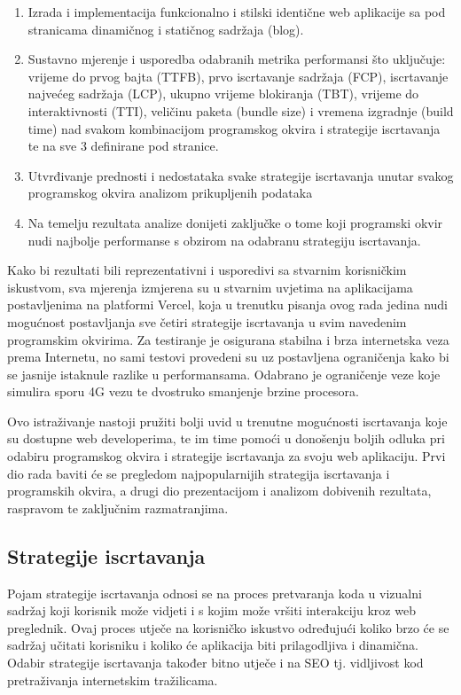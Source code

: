 \begin{enumerate}
    \item Izrada i implementacija funkcionalno i stilski identične web aplikacije sa pod stranicama dinamičnog i statičnog sadržaja (blog).
    \item Sustavno mjerenje i usporedba odabranih metrika performansi što uključuje: vrijeme do prvog bajta (TTFB), prvo iscrtavanje sadržaja (FCP), iscrtavanje najvećeg sadržaja (LCP), ukupno vrijeme blokiranja (TBT), vrijeme do interaktivnosti (TTI), veličinu paketa (bundle size) i vremena izgradnje (build time) nad svakom kombinacijom programskog okvira i strategije iscrtavanja te na sve 3 definirane pod stranice.
    \item Utvrđivanje prednosti i nedostataka svake strategije iscrtavanja unutar svakog programskog okvira analizom prikupljenih podataka
    \item Na temelju rezultata analize donijeti zaključke o tome koji programski okvir nudi najbolje performanse s obzirom na odabranu strategiju iscrtavanja.
\end{enumerate}

Kako bi rezultati bili reprezentativni i usporedivi sa stvarnim korisničkim iskustvom, sva mjerenja izmjerena su u stvarnim uvjetima na aplikacijama postavljenima na platformi Vercel, koja u trenutku pisanja ovog rada jedina nudi mogućnost postavljanja sve četiri strategije iscrtavanja u svim navedenim programskim okvirima. Za testiranje je osigurana stabilna i brza internetska veza prema Internetu, no sami testovi provedeni su uz postavljena ograničenja kako bi se jasnije istaknule razlike u performansama. Odabrano je ograničenje veze koje simulira sporu 4G vezu te dvostruko smanjenje brzine procesora.

\bigskip

Ovo istraživanje nastoji pružiti bolji uvid u trenutne mogućnosti iscrtavanja koje su dostupne web developerima, te im time pomoći u donošenju boljih odluka pri odabiru programskog okvira i strategije iscrtavanja za svoju web aplikaciju. Prvi dio rada baviti će se pregledom najpopularnijih strategija iscrtavanja i programskih okvira, a drugi dio prezentacijom i analizom dobivenih rezultata, raspravom te zaključnim razmatranjima.

\subsection{Strategije iscrtavanja}

Pojam strategije iscrtavanja odnosi se na proces pretvaranja koda u vizualni sadržaj koji korisnik može vidjeti i s kojim može vršiti interakciju kroz web preglednik. \cite{moore2024rendering} Ovaj proces utječe na korisničko iskustvo određujući koliko brzo će se sadržaj učitati korisniku i koliko će aplikacija biti prilagodljiva i dinamična.
Odabir strategije iscrtavanja također bitno utječe i na SEO tj. vidljivost kod pretraživanja internetskim tražilicama. \cite{bratslavsky2025rendering}

